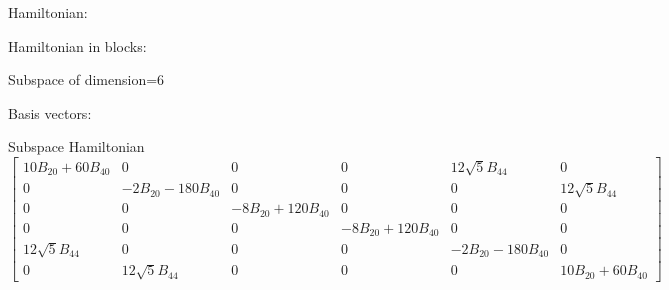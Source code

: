 \documentclass[8pt]{report}
\begin{document}
Hamiltonian:


Hamiltonian in blocks:


Subspace of dimension=6

Basis vectors: 
\begin{math}
[|5/2>, |-3/2>, |1/2>, |-1/2>, |3/2>, |-5/2>]
\end{math}

Subspace Hamiltonian
\begin{math}
\left[\begin{matrix}10 B_{20} + 60 B_{40} & 0 & 0 & 0 & 12 \sqrt{5} B_{44} & 0\\0 & - 2 B_{20} - 180 B_{40} & 0 & 0 & 0 & 12 \sqrt{5} B_{44}\\0 & 0 & - 8 B_{20} + 120 B_{40} & 0 & 0 & 0\\0 & 0 & 0 & - 8 B_{20} + 120 B_{40} & 0 & 0\\12 \sqrt{5} B_{44} & 0 & 0 & 0 & - 2 B_{20} - 180 B_{40} & 0\\0 & 12 \sqrt{5} B_{44} & 0 & 0 & 0 & 10 B_{20} + 60 B_{40}\end{matrix}\right]
\end{math}
\end{document}
